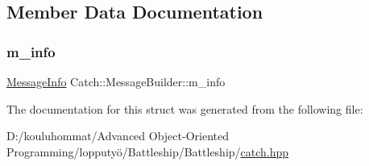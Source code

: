 \subsection{Member Data Documentation}
\mbox{\label{struct_catch_1_1_message_builder_a979f1c2b36d78f80ee275bfa5ba0209f}} 
\subsubsection{\texorpdfstring{m\+\_\+info}{m\_info}}
{\footnotesize\ttfamily \mbox{\hyperlink{struct_catch_1_1_message_info}{Message\+Info}} Catch\+::\+Message\+Builder\+::m\+\_\+info}



The documentation for this struct was generated from the following file\+:\begin{DoxyCompactItemize}
\item 
D\+:/kouluhommat/\+Advanced Object-\/\+Oriented Programming/lopputyö/\+Battleship/\+Battleship/\mbox{\hyperlink{catch_8hpp}{catch.\+hpp}}\end{DoxyCompactItemize}

